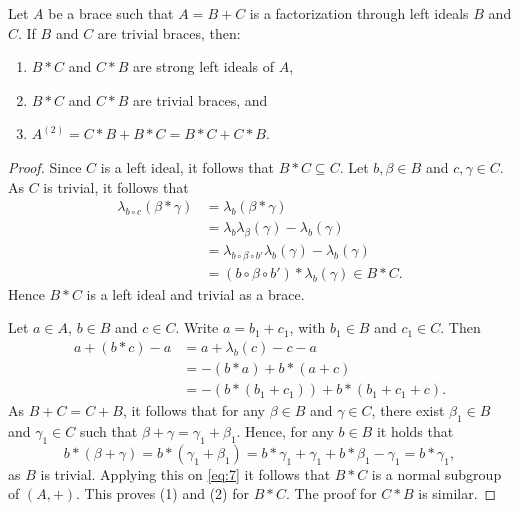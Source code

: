 \begin{lemma}
\label{lem:hardworkfactoriz}
Let $A$ be a brace such that $A=B+C$ is a factorization through left ideals  $B$ and $C$. If $B$ and $C$ are trivial braces, then: 
\begin{enumerate}
    \item $B*C$ and $C*B$ are strong left ideals of $A$,
    \item $B*C$ and $C*B$ are trivial braces, and 
    \item $A^{(2)} = C*B+B*C=B*C+C*B$.
\end{enumerate}
\end{lemma}

\begin{proof}
Since $C$ is a left ideal, it follows that $B*C \subseteq C$. 
Let $b,\beta \in B$ and $c, \gamma \in C$. As $C$ is trivial, it follows that 
\begin{align*}
    \lambda_{b \circ c} (\beta * \gamma) & =\lambda_b(\beta * \gamma)\\
                                         & =\lambda_b \lambda_{\beta} (\gamma) - \lambda_b(\gamma)\\
                                         & =\lambda_{b \circ \beta \circ b'}\lambda_b(\gamma) -\lambda_b(\gamma)\\
                                         & =(b \circ \beta \circ b') * \lambda_b(\gamma) \in B*C. 
\end{align*}
Hence $B*C$ is a left ideal and trivial as a brace. 

Let $a \in A$, $b \in B$ and $c \in C$. Write $a=b_1 + c_1$, with $b_1 \in B$ and $c_1 \in C$. Then
\begin{equation}\label{eq:7}
    \begin{aligned}
        a+(b*c)-a & =a + \lambda_b(c) - c - a\\
                  & =-(b*a) + b*(a+c)\\
                  & =-(b*(b_1+c_1)) + b* (b_1 + c_1+c).
    \end{aligned}
\end{equation}
As $B+C=C+B$, it follows that for any $\beta \in B$ and $\gamma \in C$, there exist $\beta_1\in B$ and $\gamma_1\in C$ such that
$\beta + \gamma = \gamma_1 + \beta_1$. Hence, for any $b \in B$ it holds that
\[
b*(\beta + \gamma)=b*(\gamma_1 + \beta_1)= b*\gamma_1 + \gamma_1 + b*\beta_1 - \gamma_1=b*\gamma_1 ,
\]
as $B$ is trivial. Applying this on \eqref{eq:7} it follows that $B*C$ is a normal subgroup of $(A,+)$.
This proves (1) and (2) for $B*C$. The proof for $C*B$ is similar.


\end{proof}
